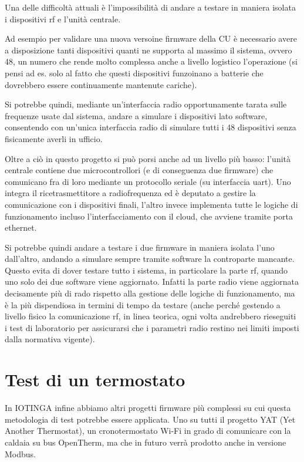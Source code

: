 \documentclass[12pt,a4paper,twoside,titlepage]{book}
\begin{document}
Una delle difficoltà attuali è l'impossibilità di andare a testare in maniera isolata i
dispositivi \Gls{rf} e l'unità centrale.

Ad esempio per validare una nuova versoine firmware della CU è necessario avere a disposizione tanti dispositivi quanti
ne supporta al massimo il sistema, ovvero 48, un numero che rende molto complessa anche a
livello logistico l'operazione (si pensi ad es. solo al fatto che questi dispositivi funzoinano a
batterie che dovrebbero essere continuamente mantenute cariche).

Si potrebbe quindi, mediante un'interfaccia radio opportunamente tarata sulle frequenze usate
dal sistema, andare a simulare i dispositivi lato software, consentendo con un'unica interfaccia
radio di simulare tutti i 48 dispositivi senza fisicamente averli in ufficio.

Oltre a ciò in questo progetto si può porsi anche ad un livello più basso: l'unità
centrale contiene due microcontrollori (e di conseguenza due \gls{firmware}) che comunicano fra di
loro mediante un protocollo seriale (su interfaccia \Gls{uart}). Uno integra il ricetrasmettitore
a radiofrequenza ed è deputato a gestire la comunicazione con i dispositivi
finali, l'altro invece implementa tutte le logiche di funzionamento incluso l'interfacciamento
con il cloud, che avviene tramite porta ethernet.

Si potrebbe quindi andare a testare i due \gls{firmware} in maniera isolata l'uno dall'altro,
andando a simulare sempre tramite software la controparte mancante. Questo evita di dover
testare tutto i sistema, in particolare la parte \Gls{rf}, quando uno solo dei due software viene
aggiornato. Infatti la parte radio viene aggiornata decisamente più di rado rispetto alla
gestione delle logiche di funzionamento, ma è la più dispendiosa in termini di tempo da testare
(anche perché gestendo a livello fisico la comunicazione \Gls{rf}, in linea teorica, ogni volta andrebbero
rieseguiti i test di laboratorio per assicurarsi che i parametri radio restino nei limiti
imposti dalla normativa vigente).

\section{Test di un termostato}

In IOTINGA infine abbiamo altri progetti \gls{firmware} più complessi su cui questa metodologia
di test potrebbe essere applicata. Uno su tutti il progetto YAT (Yet Another Thermostat),
un cronotermostato Wi-Fi in grado di comunicare con la caldaia su bus OpenTherm, ma
che in futuro verrà prodotto anche in versione Modbus.
\end{document}
